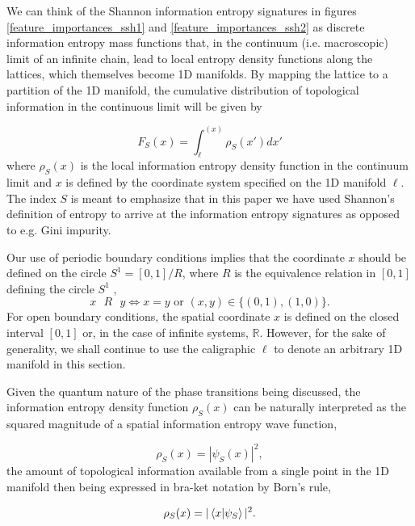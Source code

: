 \documentclass[10pt]{revtex4-1}
\begin{document}
We can think of the Shannon information entropy signatures in figures \ref{feature_importances_ssh1} and \ref{feature_importances_ssh2} as discrete information entropy mass functions that, in the continuum (i.e. macroscopic) limit of an infinite chain, lead to local entropy density functions along the lattices, which themselves become 1D manifolds. By mapping the lattice to a  partition of the 1D manifold, the cumulative distribution of topological information in the continuous limit will be given by

\begin{equation}
\label{entropy_density}
F_S(x) = \int_{\ell}^{(x)}\rho_S(x')dx'
\end{equation}
where $\rho_S(x)$ is the local information entropy density function in the continuum limit and $x$ is defined by the coordinate system specified on the 1D manifold $\ell$. The index $S$ is meant to emphasize that in this paper we have used Shannon's definition of entropy to arrive at the information entropy signatures as opposed to e.g. Gini impurity. 

Our use of periodic boundary conditions implies that the coordinate $x$ should be defined on the circle $ S^1 = [0, 1]/R$, where $R$ is the equivalence relation in $[0,1]$ defining the circle $S^1$ , 
\begin{equation}
x \text{ } R \text{ } y \iff x=y \text{ or } (x,y)\in \{(0,1), (1,0)\}.
\end{equation}
For open boundary conditions, the spatial coordinate $x$ is defined on the closed interval $[0,1]$ or, in the case of infinite systems, $\mathbb{R}$. However, for the sake of generality, we shall continue to use the caligraphic $\ell$ to denote an arbitrary 1D manifold in this section. 

Given the quantum nature of the phase transitions being discussed, the information entropy density function $\rho_S(x)$ can be naturally interpreted as the squared magnitude of a spatial information entropy wave function,

\begin{equation}
\label{shannon_wave_function}
\rho_S(x) = |\psi_S(x)|^2,
\end{equation}
the amount of topological information available from a single point in the 1D manifold then being expressed in bra-ket notation by Born's rule,  

\begin{equation}
\label{born_rule_spatial}
\rho_S(x) = |\braket{x|\psi_S}|^2.
\end{equation}
\end{document}
